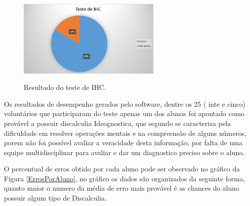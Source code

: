\documentclass[
	12pt,				%
    oneside,			%
	a4paper,			%
	english,			%
	french,				%
	spanish,			%
	brazil,				%
	]{abntex2}
\begin{document}
\begin{figure} [h] 


\caption{Resultado do teste de IHC.}

\includegraphics[width=0.62\textwidth]{testedeihc.png} %
\centering
\\
\label{testedeihc}
\end{figure}


Os resultados de desempenho gerados pelo software, dentre os 25 ( inte e cinco) voluntários que participaram do teste apenas um dos alunos foi apontado como provável a possuir discalculia Ideognostica, que segundo \cite{Kosk} se caracteriza pela dificuldade em resolver operações mentais e na compreensão de alguns números, porem não foi possível avaliar a veracidade desta informação, por falta de uma equipe multidisciplinar para avaliar e dar um diagnostico preciso sobre o aluno. 

O percentual de erros obtido por cada aluno pode ser observado no gráfico da Figura \ref{ErrosPorAluno}, no gráfico os dados são organizados da seguinte forma, quanto maior o numero da média de erro mais provável é as chances do aluno possuir algum tipo de Discalculia.
\end{document}
